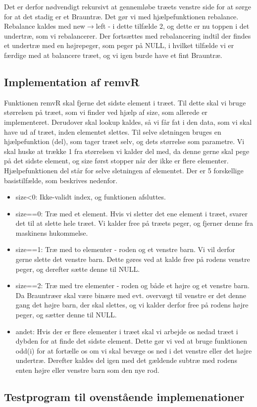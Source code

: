 \documentclass[10pt,a4paper,danish]{article}
\begin{document}
Det er derfor nødvendigt rekursivt at gennemløbe træets venstre side for at sørge for at det stadig er et Brauntræ. Det gør vi med hjælpefunktionen rebalance. Rebalance kaldes med new$\rightarrow$left - i dette tilfælde 2, og dette er nu toppen i det undertræ, som vi rebalancerer. Der fortsættes med rebalancering indtil der findes et undertræ med en højrepeger, som peger på NULL, i hvilket tilfælde vi er færdige med at balancere træet, og vi igen burde have et fint Brauntræ.

\subsection{Implementation af remvR}
Funktionen remvR skal fjerne det sidste element i træet. Til dette skal vi bruge størrelsen på træet, som vi finder ved hjælp af size, som allerede er implementeret. Derudover skal lookup kaldes, så vi får fat i den data, som vi skal have ud af træet, inden elementet slettes. Til selve sletningen bruges en hjælpefunktion (del), som tager træet selv, og dets størrelse som parametre. Vi skal huske at trække 1 fra størrelsen vi kalder del med, da denne gerne skal pege på det sidste element, og size først stopper når der ikke er flere elementer.\\

Hjælpefunktionen del står for selve sletningen af elementet. Der er 5 forskellige basistilfælde, som beskrives nedenfor. 

\begin{itemize}
\item size<0: Ikke-validt index, og funktionen afsluttes. 
\item size==0: Træ med et element. Hvis vi sletter det ene element i træet, svarer det til at slette hele træet. Vi kalder free på træets peger, og fjerner denne fra maskinens hukommelse. 
\item size==1: Træ med to elementer - roden og et venstre barn. Vi vil derfor gerne slette det venstre barn. Dette gøres ved at kalde free på rodens venstre peger, og derefter sætte denne til NULL.
\item size==2: Træ med tre elementer - roden og både et højre og et venstre barn. Da Brauntræer skal være binære med evt. overvægt til venstre er det denne gang det højre barn, der skal slettes, og vi kalder derfor free på rodens højre peger, og sætter denne til NULL.
\item andet: Hvis der er flere elementer i træet skal vi arbejde os nedad træet i dybden for at finde det sidste element. Dette gør vi ved at bruge funktionen odd(i) for at fortælle os om vi skal bevæge os ned i det venstre eller det højre undertræ. Derefter kaldes del igen med det gældende subtræ med rodens enten højre eller venstre barn som den nye rod.
\end{itemize}

\subsection{Testprogram til ovenstående implemenationer}
\end{document}

